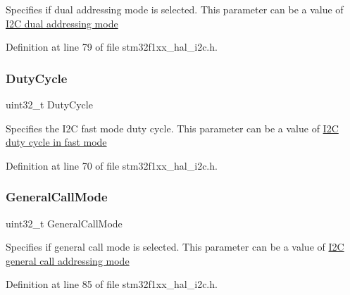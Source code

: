 Specifies if dual addressing mode is selected. This parameter can be a value of \hyperlink{group___i2_c__dual__addressing__mode}{I2C dual addressing mode} 

Definition at line 79 of file stm32f1xx\+\_\+hal\+\_\+i2c.\+h.

\mbox{\label{struct_i2_c___init_type_def_a762a4d954f3ccee6017e31fe902fb1c1}} 
\subsubsection{\texorpdfstring{Duty\+Cycle}{DutyCycle}}
{\footnotesize\ttfamily uint32\+\_\+t Duty\+Cycle}

Specifies the I2C fast mode duty cycle. This parameter can be a value of \hyperlink{group___i2_c__duty__cycle__in__fast__mode}{I2C duty cycle in fast mode} 

Definition at line 70 of file stm32f1xx\+\_\+hal\+\_\+i2c.\+h.

\mbox{\label{struct_i2_c___init_type_def_afc70f58c0935194064d720779fbf22b5}} 
\subsubsection{\texorpdfstring{General\+Call\+Mode}{GeneralCallMode}}
{\footnotesize\ttfamily uint32\+\_\+t General\+Call\+Mode}

Specifies if general call mode is selected. This parameter can be a value of \hyperlink{group___i2_c__general__call__addressing__mode}{I2C general call addressing mode} 

Definition at line 85 of file stm32f1xx\+\_\+hal\+\_\+i2c.\+h.

\mbox{\label{struct_i2_c___init_type_def_a47971fd08a9784eddaa3d83fb998030c}} 
